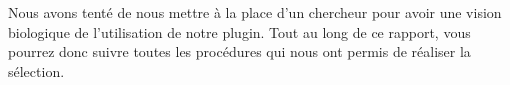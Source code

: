 
Nous avons tenté de nous mettre à la place d'un chercheur pour avoir une vision biologique de l'utilisation de notre plugin. Tout au long de ce rapport, vous pourrez donc suivre toutes les procédures qui nous ont permis de réaliser la sélection. 
